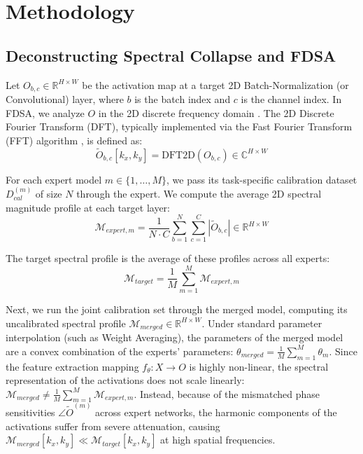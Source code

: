 \documentclass{article}
\theoremstyle{plain}
\theoremstyle{definition}
\theoremstyle{remark}
\begin{document}
\section{Methodology}
\label{sec:method}

\subsection{Deconstructing Spectral Collapse and FDSA}
Let $O_{b,c} \in \mathbb{R}^{H \times W}$ be the activation map at a target 2D Batch-Normalization (or Convolutional) layer, where $b$ is the batch index and $c$ is the channel index. In FDSA, we analyze $O$ in the 2D discrete frequency domain \cite{oppenheim1999discrete, gonzalez2018digital}. The 2D Discrete Fourier Transform (DFT), typically implemented via the Fast Fourier Transform (FFT) algorithm \cite{cooley1965algorithm}, is defined as:
\begin{equation}
    \tilde{O}_{b,c}[k_x, k_y] = \text{DFT2D}(O_{b,c}) \in \mathbb{C}^{H \times W}
\end{equation}

For each expert model $m \in \{1, \dots, M\}$, we pass its task-specific calibration dataset $D^{(m)}_{cal}$ of size $N$ through the expert. We compute the average 2D spectral magnitude profile at each target layer:
\begin{equation}
    \mathcal{M}_{expert, m} = \frac{1}{N \cdot C} \sum_{b=1}^{N} \sum_{c=1}^C |\tilde{O}_{b,c}| \in \mathbb{R}^{H \times W}
\end{equation}

The target spectral profile is the average of these profiles across all experts:
\begin{equation}
    \mathcal{M}_{target} = \frac{1}{M} \sum_{m=1}^M \mathcal{M}_{expert, m}
\end{equation}

Next, we run the joint calibration set through the merged model, computing its uncalibrated spectral profile $\mathcal{M}_{merged} \in \mathbb{R}^{H \times W}$. Under standard parameter interpolation (such as Weight Averaging), the parameters of the merged model are a convex combination of the experts' parameters: $\theta_{merged} = \frac{1}{M}\sum_{m=1}^M \theta_m$. Since the feature extraction mapping $f_\theta: X \to O$ is highly non-linear, the spectral representation of the activations does not scale linearly: $\mathcal{M}_{merged} \neq \frac{1}{M}\sum_{m=1}^M \mathcal{M}_{expert, m}$. Instead, because of the mismatched phase sensitivities $\angle \tilde{O}^{(m)}$ across expert networks, the harmonic components of the activations suffer from severe attenuation, causing $\mathcal{M}_{merged}[k_x, k_y] \ll \mathcal{M}_{target}[k_x, k_y]$ at high spatial frequencies.
\end{document}
